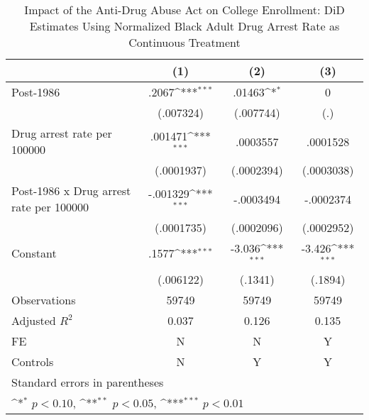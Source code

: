 \begin{table}[htbp]\centering
\def\sym#1{\ifmmode^{#1}\else\(^{#1}\)\fi}
\caption{Impact of the Anti-Drug Abuse Act on College Enrollment: DiD Estimates Using Normalized Black Adult Drug Arrest Rate as Continuous Treatment}
\begin{tabular}{l*{3}{c}}
\hline\hline
                    &\multicolumn{1}{c}{(1)}         &\multicolumn{1}{c}{(2)}         &\multicolumn{1}{c}{(3)}         \\
\hline
Post-1986           &       .2067\sym{***}&      .01463\sym{*}  &           0         \\
                    &   (.007324)         &   (.007744)         &         (.)         \\
[1em]
Drug arrest rate per 100000&     .001471\sym{***}&    .0003557         &    .0001528         \\
                    &  (.0001937)         &  (.0002394)         &  (.0003038)         \\
[1em]
Post-1986 x Drug arrest rate per 100000&    -.001329\sym{***}&   -.0003494         &   -.0002374         \\
                    &  (.0001735)         &  (.0002096)         &  (.0002952)         \\
[1em]
Constant            &       .1577\sym{***}&      -3.036\sym{***}&      -3.426\sym{***}\\
                    &   (.006122)         &     (.1341)         &     (.1894)         \\
\hline
Observations        &       59749         &       59749         &       59749         \\
Adjusted \(R^{2}\)  &       0.037         &       0.126         &       0.135         \\
FE                  &           N         &           N         &           Y         \\
Controls            &           N         &           Y         &           Y         \\
\hline\hline
\multicolumn{4}{l}{\footnotesize Standard errors in parentheses}\\
\multicolumn{4}{l}{\footnotesize \sym{*} \(p<0.10\), \sym{**} \(p<0.05\), \sym{***} \(p<0.01\)}\\
\end{tabular}
\end{table}
